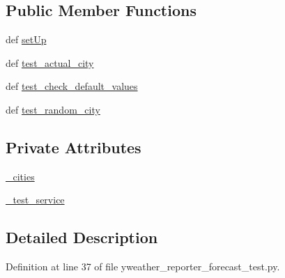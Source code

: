 \subsection*{Public Member Functions}
\begin{DoxyCompactItemize}
\item 
def \hyperlink{classyweather__reporter__forecast__test_1_1TestForecastYWeatherReporter_a99cfc3d9cec40f7e89b35f1e4d2fc77c}{set\-Up}
\item 
def \hyperlink{classyweather__reporter__forecast__test_1_1TestForecastYWeatherReporter_a4f6e27fa545d9729e941b48865527959}{test\-\_\-actual\-\_\-city}
\item 
def \hyperlink{classyweather__reporter__forecast__test_1_1TestForecastYWeatherReporter_a803cae9ccedd160a85ee51f05dd4aa93}{test\-\_\-check\-\_\-default\-\_\-values}
\item 
def \hyperlink{classyweather__reporter__forecast__test_1_1TestForecastYWeatherReporter_a7b45e4c554f5fbd377cee56cf620abd0}{test\-\_\-random\-\_\-city}
\end{DoxyCompactItemize}
\subsection*{Private Attributes}
\begin{DoxyCompactItemize}
\item 
\hyperlink{classyweather__reporter__forecast__test_1_1TestForecastYWeatherReporter_a3c4be15f4d792d68605b6101107e2e64}{\-\_\-cities}
\item 
\hyperlink{classyweather__reporter__forecast__test_1_1TestForecastYWeatherReporter_a13a042e1b15c55dd3d8e9d65406d4dd3}{\-\_\-test\-\_\-service}
\end{DoxyCompactItemize}


\subsection{Detailed Description}


Definition at line 37 of file yweather\-\_\-reporter\-\_\-forecast\-\_\-test.\-py.



